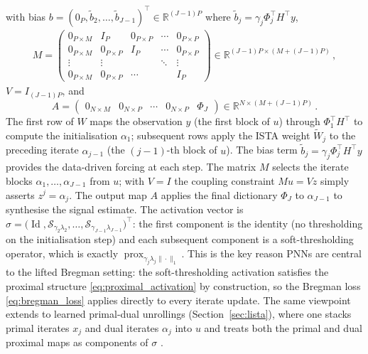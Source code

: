 with bias $b = (0_P, \tilde{b}_2, \ldots, \tilde{b}_{J-1})^\top \in \mathbb{R}^{(J-1)P}$ where $\tilde{b}_j = \gamma_j \Phi_j^\top H^\top y$,
\begin{align*}
    M = \begin{pmatrix}
        0_{P \times M} & I_P & 0_{P \times P} & \cdots & 0_{P \times P} \\
        0_{P \times M} & 0_{P \times P} & I_P & \cdots & 0_{P \times P} \\
        \vdots & \vdots & & \ddots & \vdots \\
        0_{P \times M} & 0_{P \times P} & \cdots & & I_P
    \end{pmatrix} \in \mathbb{R}^{(J-1)P \times (M+(J-1)P)} \, ,
\end{align*}
$V = I_{(J-1)P}$, and
\begin{equation*}
    A = \begin{pmatrix} 0_{N \times M} & 0_{N \times P} & \cdots & 0_{N \times P} & \Phi_J \end{pmatrix} \in \mathbb{R}^{N \times (M+(J-1)P)} \, .
\end{equation*}
The first row of $W$ maps the observation $y$ (the first block of $u$) through $\Phi_1^\top H^\top$ to compute the initialisation $\alpha_1$; subsequent rows apply the ISTA weight $\widetilde{W}_j$ to the preceding iterate $\alpha_{j-1}$ (the $(j-1)$-th block of $u$). The bias term $\tilde{b}_j = \gamma_j \Phi_j^\top H^\top y$ provides the data-driven forcing at each step. The matrix $M$ selects the iterate blocks $\alpha_1, \ldots, \alpha_{J-1}$ from $u$; with $V = I$ the coupling constraint $Mu = Vz$ simply asserts $z^j = \alpha_j$. The output map $A$ applies the final dictionary $\Phi_J$ to $\alpha_{J-1}$ to synthesise the signal estimate. The activation vector is $\sigma = \bigl(\operatorname{Id}, \mathcal{S}_{\gamma_2\lambda_2}, \ldots, \mathcal{S}_{\gamma_{J-1}\lambda_{J-1}}\bigr)^\top$: the first component is the identity (no thresholding on the initialisation step) and each subsequent component is a soft-thresholding operator, which is exactly $\operatorname{prox}_{\gamma_j\lambda_j\|\cdot\|_1}$. This is the key reason PNNs are central to the lifted Bregman setting: the soft-thresholding activation satisfies the proximal structure \eqref{eq:proximal_activation} by construction, so the Bregman loss \eqref{eq:bregman_loss} applies directly to every iterate update. The same viewpoint extends to learned primal-dual unrollings (Section~\ref{sec:lista}), where one stacks primal iterates $x_j$ and dual iterates $\alpha_j$ into $u$ and treats both the primal and dual proximal maps as components of $\sigma$ \cite{wang2025unified}.

